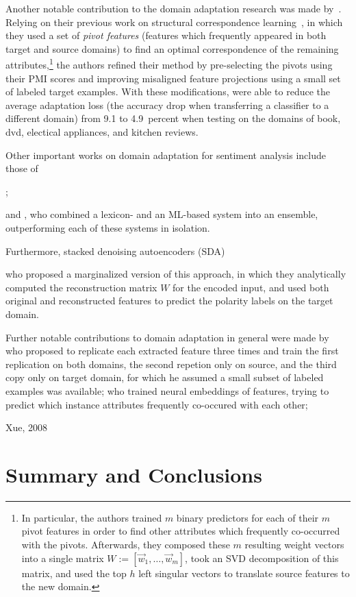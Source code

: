 Another notable contribution to the domain adaptation research was
made by~\citet{Blitzer:07}.  Relying on their previous work on
structural correspondence learning~\cite{Blitzer:07}, in which they
used a set of \emph{pivot features} (features which frequently
appeared in both target and source domains) to find an optimal
correspondence of the remaining attributes,\footnote{In particular,
  the authors trained $m$ binary predictors for each of their $m$
  pivot features in order to find other attributes which frequently
  co-occurred with the pivots.  Afterwards, they composed these $m$
  resulting weight vectors into a single matrix
  $W := [\vec{w}_{1},\ldots,\vec{w}_{m}]$, took an SVD decomposition
  of this matrix, and used the top $h$ left singular vectors to
  translate source features to the new domain.} the authors refined
their method by pre-selecting the pivots using their PMI scores and
improving misaligned feature projections using a small set of labeled
target examples.  With these modifications, \citeauthor{Blitzer:07}
were able to reduce the average adaptation loss (the accuracy drop
when transferring a classifier to a different domain) from 9.1 to
4.9~percent when testing on the domains of book, dvd, electical
appliances, and kitchen reviews.

Other important works on domain adaptation for sentiment analysis
include those of~\citet{Read:05}

\citet{Tan:07}

;

and \citet{Andreevskaia:08}, who combined a lexicon- and an ML-based
system into an ensemble, outperforming each of these systems in
isolation.

Furthermore, \citet{Glorot:11} stacked denoising autoencoders (SDA)

\citet{Chen:12} who proposed a marginalized version of this approach,
in which they analytically computed the reconstruction matrix $W$ for
the encoded input, and used both original and reconstructed features
to predict the polarity labels on the target domain.


Further notable contributions to domain adaptation in
general were made by~\citet{Daume:07} who proposed to replicate each
extracted feature three times and train the first replication on both
domains, the second repetion only on source, and the third copy only
on target domain, for which he assumed a small subset of labeled
examples was available; \citet{Yang:15} who trained neural embeddings
of features, trying to predict which instance attributes frequently
co-occured with each other;

\citet{Ganchev:10}



Xue, 2008


\section{Summary and Conclusions}\label{slsa:subsec:conclusions}
